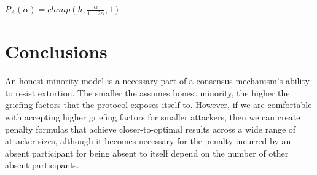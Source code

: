 \documentclass[12pt]{article}
\begin{document}
$P_A(\alpha) = clamp(h, \frac{\alpha}{1 - 2\alpha}, 1)$

\section{Conclusions}\label{conclusions}
An honest minority model is a necessary part of a consensus mechanism's ability to resist extortion. The smaller the assumes honest minority, the higher the griefing factors that the protocol exposes itself to. However, if we are comfortable with accepting higher griefing factors for smaller attackers, then we can create penalty formulas that achieve closer-to-optimal results across a wide range of attacker sizes, although it becomes necessary for the penalty incurred by an absent participant for being absent to itself depend on the number of other absent participants.



\end{document}
